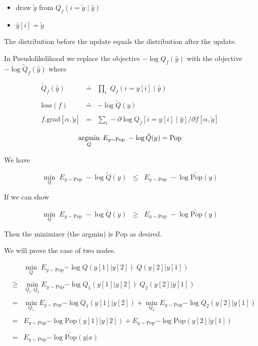 {\begin{itemize}
\item draw $\tilde{y}$ from $Q_f(i = \tilde{y} \;|\;\hat{y})$

\item $\hat{y}[i] = \tilde{y}$
\end{itemize}


\vfill
The distribution before the update equals the distribution after the update.


In Pseudolikelihood we replace the objective $- \log Q_f(\hat{y})$ with the objective $- \log \tilde{Q}_f(\hat{y})$ where

\vfill
\begin{eqnarray*}
  \tilde{Q}_f(\hat{y}) & \doteq & \prod_i \;Q_f(i = \hat{y}[i] \;|\;\hat{y}) \\
  \\
  \mathrm{loss}(f) & \doteq & - \log \tilde{Q}(y) \\
  \\
  f.\mathrm{grad}[\alpha,\tilde{y}] & = & \sum_i - \partial \log Q_f[i = \hat{y}[i] \;|\;\hat{y}] /\partial f[\alpha,\tilde{y}]
\end{eqnarray*}



$$\operatorname*{argmin}_Q \; E_{y \sim \mathrm{Pop}} \;-\log \tilde{Q}(y) = \mathrm{Pop}$$

\vfill


We have

$$\min_{Q} \;E_{y \sim \mathrm{Pop}}\;-\log \tilde{Q}(y) \;\;\leq \;\; E_{y \sim \mathrm{Pop}}\;-\log \widetilde{\mathrm{Pop}}(y)$$

\vfill
If we can show

$$\min_{Q} \;E_{y \sim \mathrm{Pop}}\;-\log \tilde{Q}(y) \;\;\geq \;\; E_{y \sim \mathrm{Pop}}\;-\log \widetilde{\mathrm{Pop}}(y)$$

Then the minimizer (the argmin) is $\mathrm{Pop}$ as desired.


We will prove the case of two nodes.

\vfill
\begin{eqnarray*}
  & & \min_Q \;E_{y\sim \mathrm{Pop}}{-\log Q(y[1]|y[2])\;Q(y[2]|y[1])} \\
  \\
  & \geq & \min_{Q_1,Q_2} E_{y \sim \mathrm{Pop}}{-\log Q_1(y[1]|y[2])\;Q_2(y[2]|y[1])} \\
  \\
  & = & \min_{Q_1} E_{y \sim \mathrm{Pop}}{-\log Q_1(y[1]|y[2])} + \min_{Q_2} E_{y \sim \mathrm{Pop}}{-\log Q_2(y[2]|y[1])} \\
  \\
  & = & E_{y \sim \mathrm{Pop}}{-\log \mathrm{Pop}(y[1]|y[2])} + E_{y \sim \mathrm{Pop}}{-\log \mathrm{Pop}(y[2]|y[1])} \\
  \\
  & = & E_{y \sim \mathrm{Pop}}{-\log \widetilde{\mathrm{Pop}}(y|x)}
\end{eqnarray*}

}
